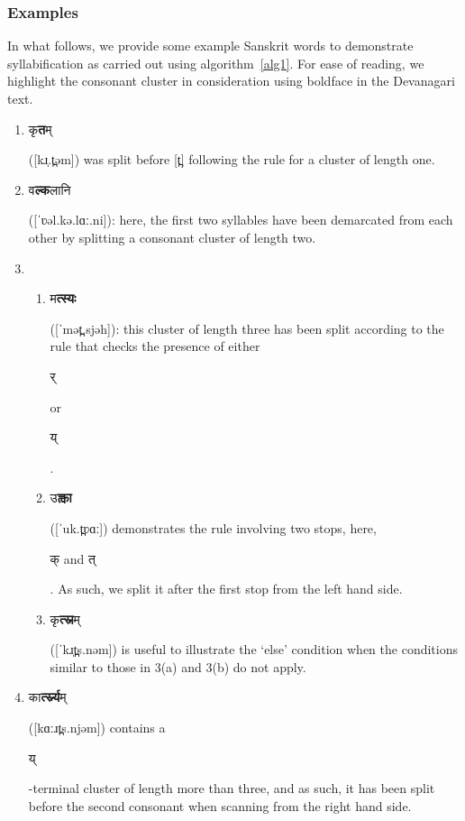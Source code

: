 \documentclass[10pt,a4paper]{article}
\newcommand{\sansk}[1]{\begin{sanskrit}#1\end{sanskrit}}
\begin{document}
\subsubsection{Examples}
In what follows, we provide some example Sanskrit words to demonstrate syllabification as carried out using algorithm~\ref{alg1}. For ease of reading, we highlight the consonant cluster in consideration using boldface in the Devanagari text.
\begin{enumerate}
	\item \sansk{कृ\textbf{त}म्} ([kɹ̩.t̪əm]) was split before [t̪] following the rule for a cluster of length one.
	
	\item \sansk{व\textbf{ल्क}लानि} ([ˈʋəl.kə.lɑː.ni]): here, the first two syllables have been demarcated from each other by splitting a consonant cluster of length two.
	
	\item 
	\begin{enumerate}
		\item \sansk{म\textbf{त्स्यः}} ([ˈmət̪.sjəh]): this cluster of length three has been split according to the rule that checks the presence of either \sansk{र्} or \sansk{य्}.
		
		\item
		\sansk{उ\textbf{क्त्वा}} ([ˈuk.t̪ʋɑː]) demonstrates the rule involving two stops, here, \sansk{क् and त्}. As such, we split it after the first stop from the left hand side.
		
		\item
		\sansk{कृ\textbf{त्स्न}म्} ([ˈkɹ̩t̪s.nəm]) is useful to illustrate the `else' condition when the conditions similar to those in 3(a) and 3(b) do not apply.
	\end{enumerate}
	
	\item
		
		\sansk{का\textbf{र्त्स्न्य}म्} ([kɑːɹt̪s.njəm]) contains a \sansk{य्}-terminal cluster of length more than three, and as such, it has been split before the second consonant when scanning from the right hand side.
		
	
\end{enumerate}
\end{document}
